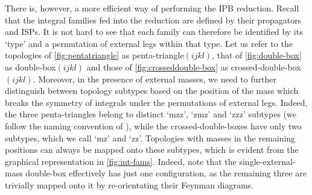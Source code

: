 \documentclass[main.tex]{subfiles}
\begin{document}
There is, however, a more efficient way of performing the IPB reduction. Recall that the integral families fed into the reduction are defined by their propagators and ISPs. It is not hard to see that each family can therefore be identified by its `type' and a permutation of external legs within that type. Let us refer to the topologies of \cref{fig:pentatriangle} as penta-triangle$(ijkl)$, that of \cref{fig:double-box} as double-box$(ijkl)$ and those of \cref{fig:crosseddouble-box} as crossed-double-box$(ijkl)$. Moreover, in the presence of external masses, we need to further distinguish between topology subtypes based on the position of the mass which breaks the symmetry of integrals under the permutations of external legs. Indeed, the three penta-triangles belong to distinct `mzz', `zmz' and `zzz' subtypes (we follow the naming convention of \cite{Abreu:2020jxa}), while the crossed-double-boxes have only two subtypes, which we call `mz' and `zz'. Topologies with masses in the remaining positions can always be mapped onto these subtypes, which is evident from the graphical representation in \cref{fig:int-fams}. Indeed, note that the single-external-mass double-box effectively has just one configuration, as the remaining three are trivially mapped onto it by re-orientating their Feynman diagrams.
\end{document}
